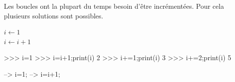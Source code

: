 \documentclass[10pt]{article}
\begin{document}
\begin{rem}
Les boucles ont la plupart du temps besoin d'être incrémentées. Pour cela plusieurs solutions sont possibles.

\begin{minipage}[c]{.3\linewidth}
\begin{pseudo}
\begin{algorithm}[H]
$i \gets 1$\\
$i \gets i+1$\\
\end{algorithm}
\end{pseudo}
\end{minipage} \hfill
\begin{minipage}[c]{.3\linewidth}
\begin{py}
\begin{python}
>>> i=1
>>> i=i+1;print(i)
    2
>>> i+=1;print(i)
    3
>>> i+=2;print(i)
    5
\end{python}
\end{py}
\end{minipage} \hfill
\begin{minipage}[c]{.3\linewidth}
\begin{sci}
\begin{scilab}
--> i=1;
--> i=i+1;
\end{scilab}
\end{sci}
\end{minipage} 

\end{rem}
\end{document}
